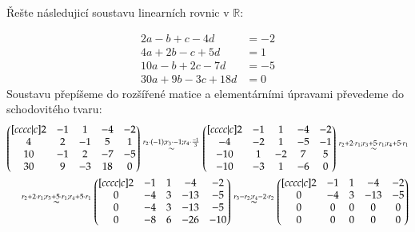 \begin{example}
    Řešte následujicí soustavu linearních rovnic v $\mathbb{R}$:

    \begin{align*}
        2a - b + c -4d &= -2\\
        4a + 2b -c + 5d &= 1\\
        10a -b +2c -7d &= -5\\
        30a + 9b -3c +18d &= 0
    \end{align*}
    Soustavu přepíšeme do rozšířené matice a elementárními úpravami
    převedeme do schodovitého tvaru:
    \begin{align*}
        \begin{pmatrix}[cccc|c]
            2 & -1 & 1 & -4 & -2\\
            4 & 2 & -1 & 5 & 1\\
            10 & -1 & 2 & -7 & -5\\
            30 & 9 & -3 & 18 & 0
        \end{pmatrix} \overset{r_2 \cdot (-1); r_3 \cdot -1; r_4 \cdot \frac{-1}{3}} \sim
        \begin{pmatrix}[cccc|c]
            2 & -1 & 1 & -4 & -2\\
            -4 & -2 & 1 & -5 & -1\\
            -10 & 1 & -2 & 7 & 5\\
            -10 & -3 & 1 & -6 & 0
        \end{pmatrix} \overset{r_2 + 2 \cdot r_1; r_3 + 5 \cdot r_1; r_4 + 5 \cdot r_1} \sim\\
        \overset{r_2 + 2 \cdot r_1; r_3 + 5 \cdot r_1; r_4 + 5 \cdot r_1} \sim
        \begin{pmatrix}[cccc|c]
            2 & -1 & 1 & -4 & -2\\
            0 & -4 & 3 & -13 & -5\\
            0 & -4 & 3 & -13 & -5\\
            0 & -8 & 6 & -26 & -10
        \end{pmatrix} \overset{r_3 - r_2; r_4 - 2\cdot r_2} \sim
        \begin{pmatrix}[cccc|c]
            2 & -1 & 1 & -4 & -2\\
            0 & -4 & 3 & -13 & -5\\
            0 & 0 & 0 & 0 & 0\\
            0 & 0 & 0 & 0 & 0
        \end{pmatrix}
    \end{align*}


\end{example}
